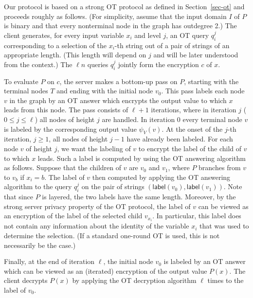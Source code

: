 \documentclass[11pt]{article}
\newcommand{\lab}{{\mathsf{label}}}
\begin{document}
Our protocol is based on a strong OT protocol as defined in
Section~\ref{sec-ot} and proceeds roughly as follows.  (For
simplicity, assume that the input domain $I$ of $P$ is binary and
that every nonterminal node in the graph has outdegree 2.) The
client generates, for every input variable $x_i$ and level $j$, an
OT query $q^j_i$ corresponding to a selection of the $x_i$-th
string out of a pair of strings of an appropriate length. (This
length will depend on $j$ and will be later understood from the
context.) The $\ell n$ queries $q^j_i$ jointly form the encryption
$c$ of $x$.

To evaluate $P$ on $c$, the server makes a bottom-up pass on $P$,
starting with the terminal nodes $T$ and ending with the initial
node $v_0$. This pass labels each node $v$ in the graph by an OT
answer which encrypts the output value to which $x$ leads from this
node. The pass consists of  $\ell+1$ iterations, where in iteration
$j$ ($0\le j\le \ell$) all nodes of height $j$ are handled. In
iteration 0 every terminal node $v$ is labeled by the corresponding
output value $\psi_V(v)$. At the onset of the $j$-th iteration,
$j\ge 1$, all nodes of height $j-1$ have already been labeled. For
each node $v$ of height $j$, we want the labeling of $v$ to encrypt
the label of the child of $v$ to which $x$ leads. Such a label is
computed by using the OT answering algorithm as follows. Suppose
that the children of $v$ are $v_0$ and $v_1$, where $P$ branches
from $v$ to $v_b$ if $x_i=b$. The label of $v$ then computed by
applying the OT answering algorithm to the query $q^j_i$ on the pair
of strings $(\lab(v_0),\lab(v_1))$. Note that since $P$ is layered,
the two labels have the same length. Moreover, by the strong server
privacy property of the OT protocol, the label of $v$ can be viewed
as an encryption of the label of the selected child $v_{x_i}$. In
particular, this label does not contain any information about the
identity of the variable $x_i$ that was used to determine the
selection. (If a standard one-round OT is used, this is not
necessarily be the case.)

Finally, at the end of iteration $\ell$, the initial node $v_0$ is
labeled by an OT answer which can be viewed as an (iterated)
encryption of the output value $P(x)$. The client decrypts $P(x)$
by applying the OT decryption algorithm $\ell$ times to the label
of $v_0$.
\end{document}
